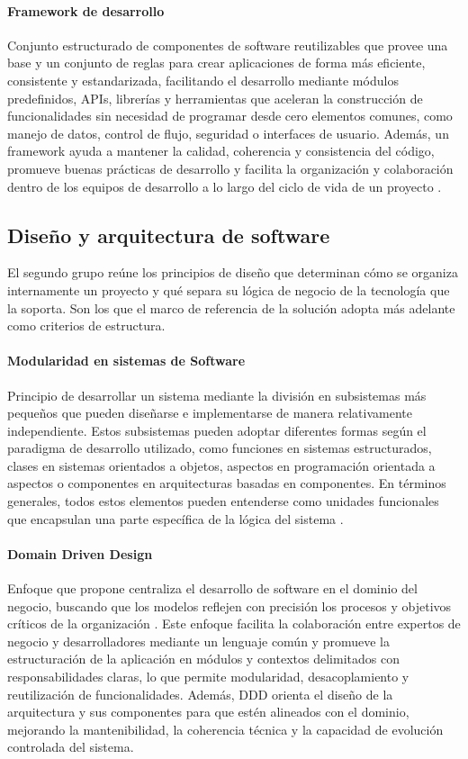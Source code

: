 \paragraph*{Framework de desarrollo}
Conjunto estructurado de componentes de software reutilizables que provee una base y un conjunto de reglas para crear aplicaciones de forma más eficiente, consistente y estandarizada, facilitando el desarrollo mediante módulos predefinidos, APIs, librerías y herramientas que aceleran la construcción de funcionalidades sin necesidad de programar desde cero elementos comunes, como manejo de datos, control de flujo, seguridad o interfaces de usuario. Además, un framework ayuda a mantener la calidad, coherencia y consistencia del código, promueve buenas prácticas de desarrollo y facilita la organización y colaboración dentro de los equipos de desarrollo a lo largo del ciclo de vida de un proyecto \citep{aws-framework-2026}.

\subsection{Diseño y arquitectura de software}

El segundo grupo reúne los principios de diseño que determinan cómo se
organiza internamente un proyecto y qué separa su lógica de negocio de
la tecnología que la soporta. Son los que el marco de referencia de la
solución adopta más adelante como criterios de estructura.
\paragraph*{Modularidad en sistemas de Software}
Principio de desarrollar un sistema mediante la división en subsistemas más pequeños que pueden diseñarse e implementarse de manera relativamente independiente. Estos subsistemas pueden adoptar diferentes formas según el paradigma de desarrollo utilizado, como funciones en sistemas estructurados, clases en sistemas orientados a objetos, aspectos en programación orientada a aspectos o componentes en arquitecturas basadas en componentes. En términos generales, todos estos elementos pueden entenderse como unidades funcionales que encapsulan una parte específica de la lógica del sistema \citep{Yu2009}.
\paragraph*{Domain Driven Design}
Enfoque que propone centraliza el desarrollo de software en el dominio del negocio, buscando que los modelos reflejen con precisión los procesos y objetivos críticos de la organización \citep{Vernon2013}. Este enfoque facilita la colaboración entre expertos de negocio y desarrolladores mediante un lenguaje común y promueve la estructuración de la aplicación en módulos y contextos delimitados con responsabilidades claras, lo que permite modularidad, desacoplamiento y reutilización de funcionalidades. Además, DDD orienta el diseño de la arquitectura y sus componentes para que estén alineados con el dominio, mejorando la mantenibilidad, la coherencia técnica y la capacidad de evolución controlada del sistema.
